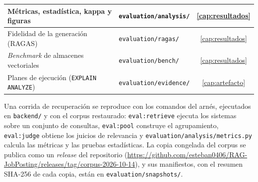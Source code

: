 \begin{table}[!htb]
\begin{tabular}{|p{5cm}|p{7.6cm}|c|}
        \hline
        Métricas, estadística, kappa y figuras & \texttt{evaluation/analysis/} & \ref{cap:resultados} \\
        \hline
        Fidelidad de la generación (RAGAS) & \texttt{evaluation/ragas/} & \ref{cap:resultados} \\
        \hline
        \textit{Benchmark} de almacenes vectoriales & \texttt{evaluation/bench/} & \ref{cap:resultados} \\
        \hline
        Planes de ejecución (\texttt{EXPLAIN ANALYZE}) & \texttt{evaluation/evidence/} & \ref{cap:artefacto} \\
        \hline
    \end{tabular}
\end{table}

Una corrida de recuperación se reproduce con los comandos del arnés, ejecutados en \texttt{backend/} y con el corpus restaurado: \texttt{eval:retrieve} ejecuta los sistemas sobre un conjunto de consultas, \texttt{eval:pool} construye el agrupamiento, \texttt{eval:judge} obtiene los juicios de relevancia y \texttt{evaluation/analysis/metrics.py} calcula las métricas y las pruebas estadísticas. La copia congelada del corpus se publica como un \textit{release} del repositorio (\url{https://github.com/esteban0406/RAG-JobPosting/releases/tag/corpus-2026-10-14}), y sus manifiestos, con el resumen SHA-256 de cada copia, están en \texttt{evaluation/snapshots/}.
